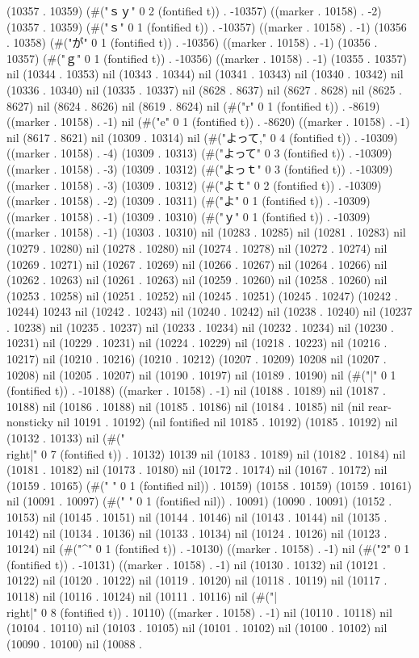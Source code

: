 (10357 . 10359) (#("ｓｙ" 0 2 (fontified t)) . -10357) ((marker . 10158) . -2) (10357 . 10359) (#("ｓ" 0 1 (fontified t)) . -10357) ((marker . 10158) . -1) (10356 . 10358) (#("が" 0 1 (fontified t)) . -10356) ((marker . 10158) . -1) (10356 . 10357) (#("ｇ" 0 1 (fontified t)) . -10356) ((marker . 10158) . -1) (10355 . 10357) nil (10344 . 10353) nil (10343 . 10344) nil (10341 . 10343) nil (10340 . 10342) nil (10336 . 10340) nil (10335 . 10337) nil (8628 . 8637) nil (8627 . 8628) nil (8625 . 8627) nil (8624 . 8626) nil (8619 . 8624) nil (#("r" 0 1 (fontified t)) . -8619) ((marker . 10158) . -1) nil (#("e" 0 1 (fontified t)) . -8620) ((marker . 10158) . -1) nil (8617 . 8621) nil (10309 . 10314) nil (#("よって," 0 4 (fontified t)) . -10309) ((marker . 10158) . -4) (10309 . 10313) (#("よって" 0 3 (fontified t)) . -10309) ((marker . 10158) . -3) (10309 . 10312) (#("よっｔ" 0 3 (fontified t)) . -10309) ((marker . 10158) . -3) (10309 . 10312) (#("よｔ" 0 2 (fontified t)) . -10309) ((marker . 10158) . -2) (10309 . 10311) (#("よ" 0 1 (fontified t)) . -10309) ((marker . 10158) . -1) (10309 . 10310) (#("ｙ" 0 1 (fontified t)) . -10309) ((marker . 10158) . -1) (10303 . 10310) nil (10283 . 10285) nil (10281 . 10283) nil (10279 . 10280) nil (10278 . 10280) nil (10274 . 10278) nil (10272 . 10274) nil (10269 . 10271) nil (10267 . 10269) nil (10266 . 10267) nil (10264 . 10266) nil (10262 . 10263) nil (10261 . 10263) nil (10259 . 10260) nil (10258 . 10260) nil (10253 . 10258) nil (10251 . 10252) nil (10245 . 10251) (10245 . 10247) (10242 . 10244) 10243 nil (10242 . 10243) nil (10240 . 10242) nil (10238 . 10240) nil (10237 . 10238) nil (10235 . 10237) nil (10233 . 10234) nil (10232 . 10234) nil (10230 . 10231) nil (10229 . 10231) nil (10224 . 10229) nil (10218 . 10223) nil (10216 . 10217) nil (10210 . 10216) (10210 . 10212) (10207 . 10209) 10208 nil (10207 . 10208) nil (10205 . 10207) nil (10190 . 10197) nil (10189 . 10190) nil (#("|" 0 1 (fontified t)) . -10188) ((marker . 10158) . -1) nil (10188 . 10189) nil (10187 . 10188) nil (10186 . 10188) nil (10185 . 10186) nil (10184 . 10185) nil (nil rear-nonsticky nil 10191 . 10192) (nil fontified nil 10185 . 10192) (10185 . 10192) nil (10132 . 10133) nil (#("\\right|" 0 7 (fontified t)) . 10132) 10139 nil (10183 . 10189) nil (10182 . 10184) nil (10181 . 10182) nil (10173 . 10180) nil (10172 . 10174) nil (10167 . 10172) nil (10159 . 10165) (#(" " 0 1 (fontified nil)) . 10159) (10158 . 10159) (10159 . 10161) nil (10091 . 10097) (#(" " 0 1 (fontified nil)) . 10091) (10090 . 10091) (10152 . 10153) nil (10145 . 10151) nil (10144 . 10146) nil (10143 . 10144) nil (10135 . 10142) nil (10134 . 10136) nil (10133 . 10134) nil (10124 . 10126) nil (10123 . 10124) nil (#("^" 0 1 (fontified t)) . -10130) ((marker . 10158) . -1) nil (#("2" 0 1 (fontified t)) . -10131) ((marker . 10158) . -1) nil (10130 . 10132) nil (10121 . 10122) nil (10120 . 10122) nil (10119 . 10120) nil (10118 . 10119) nil (10117 . 10118) nil (10116 . 10124) nil (10111 . 10116) nil (#("|\\right|" 0 8 (fontified t)) . 10110) ((marker . 10158) . -1) nil (10110 . 10118) nil (10104 . 10110) nil (10103 . 10105) nil (10101 . 10102) nil (10100 . 10102) nil (10090 . 10100) nil (10088 . 
